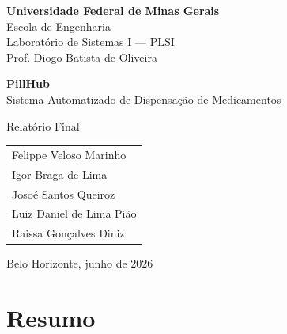 \documentclass[12pt,a4paper]{article}
\begin{document}
\begin{titlepage}
    \centering
    \vspace*{1.5cm}

    {\large\bfseries Universidade Federal de Minas Gerais}\\[0.3cm]
    {\large Escola de Engenharia}\\[0.3cm]
    {\large Laboratório de Sistemas I --- PLSI}\\[0.2cm]
    {\large Prof. Diogo Batista de Oliveira}\\

    \vspace{3cm}

    {\Huge\bfseries PillHub}\\[0.5cm]
    {\Large Sistema Automatizado de Dispensação de Medicamentos}

    \vspace{2cm}

    {\large Relatório Final}

    \vspace{2.5cm}

    \begin{tabular}{l}
        Felippe Veloso Marinho    \\[0.2cm]
        Igor Braga de Lima        \\[0.2cm]
        Josoé Santos Queiroz      \\[0.2cm]
        Luiz Daniel de Lima Pião  \\[0.2cm]
        Raissa Gonçalves Diniz    \\
    \end{tabular}

    \vfill

    {\large Belo Horizonte, junho de 2026}
\end{titlepage}

\tableofcontents
\newpage

\section*{Resumo}
\end{document}
